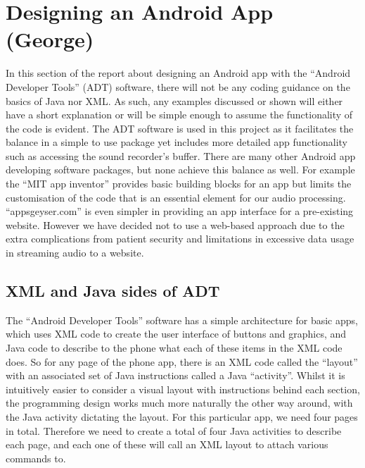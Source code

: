 \section{Designing an Android App (George)}
\label{sec:android-george}
In this section of the report about designing an Android app with the “Android Developer Tools” (ADT) software, there will not be any coding guidance on the basics of Java nor XML. As such, any examples discussed or shown will either have a short explanation or will be simple enough to assume the functionality of the code is evident. The ADT software is used in this project as it facilitates the balance in a simple to use package yet includes more detailed app functionality such as accessing the sound recorder’s buffer. There are many other Android app developing software packages, but none achieve this balance as well. For example the “MIT app inventor” provides basic building blocks for an app but limits the customisation of the code that is an essential element for our audio processing. “appsgeyser.com” is even simpler in providing an app interface for a pre-existing website. However we have decided not to use a web-based approach due to the extra complications from patient security and limitations in excessive data usage in streaming audio to a website.
\subsection{XML and Java sides of ADT}
The “Android Developer Tools” software has a simple architecture for basic apps, which uses XML code to create the user interface of buttons and graphics, and Java code to describe to the phone what each of these items in the XML code does. So for any page of the phone app, there is an XML code called the “layout” with an associated set of Java instructions called a Java “activity”. Whilst it is intuitively easier to consider a visual layout with instructions behind each section, the programming design works much more naturally the other way around, with the Java activity dictating the layout. For this particular app, we need four pages in total. Therefore we need to create a total of four Java activities to describe each page, and each one of these will call an XML layout to attach various commands to.
